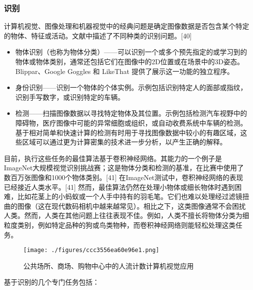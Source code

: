 \subsubsection{识别}  
计算机视觉、图像处理和机器视觉中的经典问题是确定图像数据是否包含某个特定的物体、特征或活动。文献中描述了不同种类的识别问题。[40]
\begin{itemize}
\item 物体识别（也称为物体分类）——可以识别一个或多个预先指定的或学习到的物体或物体类别，通常还包括它们在图像中的2D位置或在场景中的3D姿态。Blippar、Google Goggles 和 LikeThat 提供了展示这一功能的独立程序。
\item 身份识别——识别一个物体的个体实例。示例包括识别特定人的面部或指纹，识别手写数字，或识别特定的车辆。
\item 检测——扫描图像数据以寻找特定物体及其位置。示例包括检测汽车视野中的障碍物，医疗图像中可能的异常细胞或组织，或自动收费系统中车辆的检测。基于相对简单和快速计算的检测有时用于寻找图像数据中较小的有趣区域，这些区域可以通过更为计算密集的技术进一步分析，以产生正确的解释。
\end{itemize}
目前，执行这些任务的最佳算法基于卷积神经网络。其能力的一个例子是ImageNet大规模视觉识别挑战赛；这是物体分类和检测的基准，在比赛中使用了数百万张图像和1000个物体类别。[41] 在ImageNet测试中，卷积神经网络的表现已经接近人类水平。[41] 然而，最佳算法仍然在处理小物体或细长物体时遇到困难，比如花茎上的小蚂蚁或一个人手中持有的羽毛笔。它们也难以处理经过滤镜扭曲的图像（这在现代数码相机中越来越常见）。相比之下，这类图像通常不会困扰人类。然而，人类在其他问题上往往表现不佳。例如，人类不擅长将物体分类为细粒度类别，例如特定品种的狗或鸟类物种，而卷积神经网络则能轻松处理这类任务。
\begin{figure}[ht]
\centering
\texttt{[image: ./figures/ccc3556ea60e96e1.png]}
\caption{公共场所、商场、购物中心中的人流计数计算机视觉应用} \label{fig_JSJ_8}
\end{figure}
基于识别的几个专门任务包括：
